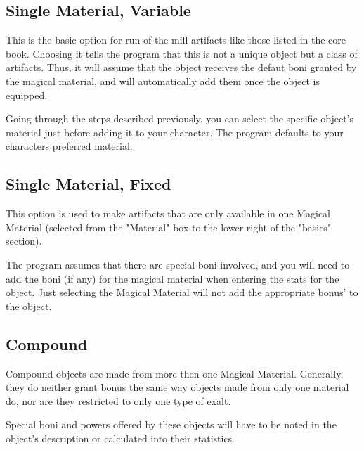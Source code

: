 \subsection{Single Material, Variable}
This is the basic option for run-of-the-mill artifacts like those listed in the core book. Choosing it tells the program that this is not a unique object but a class of artifacts. Thus, it will assume that the object receives the defaut boni granted by the magical material, and will automatically add them once the object is equipped.

Going through the steps described previously, you can select the specific object's material just before adding it to your character. The program defaults to your characters preferred material.
  
\subsection{Single Material, Fixed}
This option is used to make artifacts that are only available in one Magical Material (selected from the "Material" box to the lower right of the "basics" section).

The program assumes that there are special boni involved, and you will need to add the boni (if any) for the magical material when entering the stats for the object. Just selecting the Magical Material will not add the appropriate bonus' to the object.

\subsection{Compound}
Compound objects are made from more then one Magical Material. Generally, they do neither grant bonus the same way objects made from only one material do, nor are they restricted to only one type of exalt.  

Special boni and powers offered by these objects will have to be noted in the object's description or calculated into their statistics.